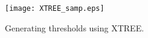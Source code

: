 \begin{figure}
\texttt{[image: XTREE\_samp.eps]}
\caption{Generating thresholds using XTREE.}
\label{fig:xtree}
\end{figure}